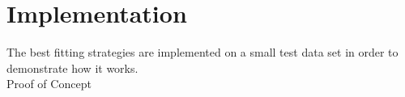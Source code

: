 \chapter{Implementation}
The best fitting strategies are implemented on a small test data set in order to demonstrate how it works.\\
Proof of Concept